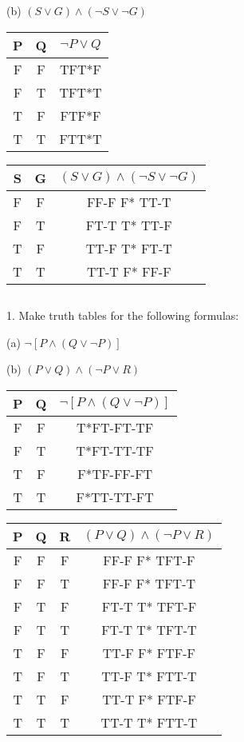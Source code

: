 \documentclass{article}
\begin{document}
(b) $(S \lor G) \land (\neg S \lor \neg G)$
\begin{center}
 \begin{tabular}{||c c c ||} 
 \hline
 P & Q & $\neg P \lor Q$ \\ [0.5ex] 
 \hline\hline
 F & F & TFT*F  \\ 
 \hline
 F & T & TFT*T  \\
 \hline
 T & F & FTF*F \\
 \hline
 T & T & FTT*T\\ [1ex] 
 \hline
\end{tabular}
\end{center}
\begin{center}
 \begin{tabular}{||c c c ||} 
 \hline
 S & G & $(S \lor G) \land (\neg S \lor \neg G)$ \\ [0.5ex] 
 \hline\hline
 F & F & FF-F F* TT-T \\ 
 \hline
 F & T & FT-T T* TT-F \\
 \hline
 T & F & TT-F T* FT-T \\
 \hline
 T & T & TT-T F* FF-F \\ [1ex] 
 \hline
\end{tabular}
\end{center}
\subsection{}
1. Make truth tables for the following formulas:

(a) $\neg [P \land (Q \lor \neg P)]$

(b) $(P \lor Q) \land (\neg P \lor R)$
\begin{center}
 \begin{tabular}{||c c c ||} 
 \hline
 P & Q & $\neg [P \land (Q \lor \neg P)]$ \\ [0.5ex] 
 \hline\hline
 F & F & T*FT-FT-TF\\ 
 \hline
 F & T & T*FT-TT-TF\\
 \hline
 T & F & F*TF-FF-FT\\
 \hline
 T & T & F*TT-TT-FT\\ [1ex] 
 \hline
\end{tabular}
\end{center}


\begin{center}
 \begin{tabular}{||c c c c ||} 
 \hline
 P & Q & R & $(P \lor Q) \land (\neg P \lor R)$ \\ [0.5ex] 
 \hline\hline
 F & F & F & FF-F F* TFT-F\\ 
 \hline
 F & F & T & FF-F F* TFT-T\\
 \hline
 F & T & F & FT-T T* TFT-F\\
 \hline
 F & T & T & FT-T T* TFT-T\\
 \hline
 T & F & F & TT-F F* FTF-F\\
 \hline
 T & F & T & TT-F T* FTT-T\\
 \hline
 T & T & F & TT-T F* FTF-F\\
 \hline
 T & T & T & TT-T T* FTT-T\\[1ex] 
 \hline
\end{tabular}
\end{center}
\end{document}
